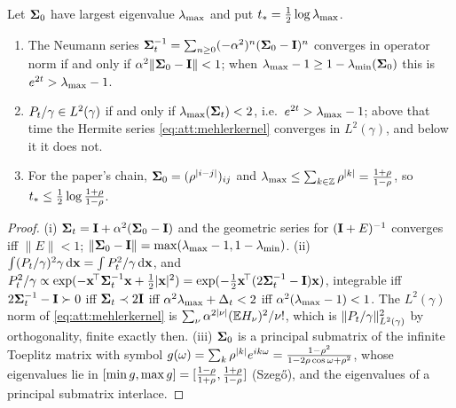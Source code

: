 \begin{proposition}
\label{prop:att:tstar}
Let $\mathbf{\Sigma}_0$ have largest eigenvalue $\lambda_{\max}$ and put $t_{*}=\tfrac12\log\lambda_{\max}$.
\begin{enumerate}
\item The Neumann series $\mathbf{\Sigma}_t^{-1}=\sum_{n\ge0}(-\alpha^2)^n(\mathbf{\Sigma}_0-\mathbf{I})^n$ converges
  in operator norm if and only if $\alpha^2\lVert\mathbf{\Sigma}_0-\mathbf{I}\rVert<1$; when
  $\lambda_{\max}-1\ge1-\lambda_{\min}(\mathbf{\Sigma}_0)$ this is $e^{2t}>\lambda_{\max}-1$.
\item $P_t/\gamma\in L^2(\gamma)$ if and only if $\lambda_{\max}(\mathbf{\Sigma}_t)<2$, i.e.\ $e^{2t}>\lambda_{\max}-1$;
  above that time the Hermite series \cref{eq:att:mehlerkernel} converges in
  $L^2(\gamma)$, and below it it does not.
\item For the paper's chain, $\mathbf{\Sigma}_0=(\rho^{|i-j|})_{ij}$ and $\lambda_{\max}\le\sum_{k\in\mathbb Z}\rho^{|k|}=\frac{1+\rho}{1-\rho}$,
  so $t_{*}\le\tfrac12\log\frac{1+\rho}{1-\rho}$.
\end{enumerate}
\end{proposition}

\begin{proof}
(i) $\mathbf{\Sigma}_t=\mathbf{I}+\alpha^2(\mathbf{\Sigma}_0-\mathbf{I})$ and the geometric series for $(\mathbf{I}+E)^{-1}$
converges iff $\lVert E\rVert<1$; $\lVert\mathbf{\Sigma}_0-\mathbf{I}\rVert=\max(\lambda_{\max}-1,1-\lambda_{\min})$.
(ii) $\int(P_t/\gamma)^2\gamma\,\mathrm{d}\mathbf{x}=\int P_t^2/\gamma\,\mathrm{d}\mathbf{x}$, and
$P_t^2/\gamma\propto\exp(-\mathbf{x}^{\!\top}\mathbf{\Sigma}_t^{-1}\mathbf{x}+\tfrac12|\mathbf{x}|^2)=\exp(-\tfrac12\mathbf{x}^{\!\top}(2\mathbf{\Sigma}_t^{-1}-\mathbf{I})\mathbf{x})$,
integrable iff $2\mathbf{\Sigma}_t^{-1}-\mathbf{I}\succ0$ iff $\mathbf{\Sigma}_t\prec2\mathbf{I}$ iff
$\alpha^2\lambda_{\max}+\Delta_t<2$ iff $\alpha^2(\lambda_{\max}-1)<1$. The $L^2(\gamma)$ norm of
\cref{eq:att:mehlerkernel} is $\sum_\nu\alpha^{2|\nu|}(\mathbb{E} H_\nu)^2/\nu!$, which is
$\lVert P_t/\gamma\rVert^2_{L^2(\gamma)}$ by orthogonality, finite exactly then.
(iii) $\mathbf{\Sigma}_0$ is a principal submatrix of the infinite Toeplitz matrix with symbol
$g(\omega)=\sum_k\rho^{|k|}e^{ik\omega}=\frac{1-\rho^2}{1-2\rho\cos\omega+\rho^2}$,
whose eigenvalues lie in $[\min g,\max g]=[\frac{1-\rho}{1+\rho},\frac{1+\rho}{1-\rho}]$
(Szeg\H{o}), and the eigenvalues of a principal submatrix interlace.
\end{proof}

